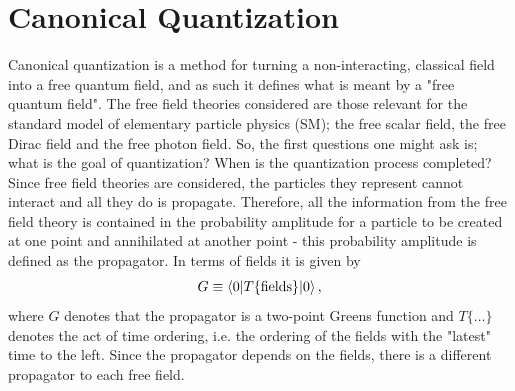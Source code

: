 \section{Canonical Quantization}
Canonical quantization is a method for turning a non-interacting, classical field into a free quantum field, and as such it defines what is meant by a "free quantum field". The free field theories considered are those relevant for the standard model of elementary particle physics (SM); the free scalar field, the free Dirac field and the free photon field.
So, the first questions one might ask is; what is the goal of quantization? When is the quantization process completed? Since free field theories are considered, the particles they represent cannot interact and all they do is propagate. Therefore, all the information from the free field theory is contained in the probability amplitude for a particle to be created at one point and annihilated at another point - this probability amplitude is defined as the propagator. In terms of fields it is given by
\begin{equation}
	G\equiv\braket{0|T\{\text{fields}\}|0},
	\label{prop def}
\end{equation} 
where $G$ denotes that the propagator is a two-point Greens function and $T\{\dots\}$ denotes the act of time ordering, i.e. the ordering of the fields with the "latest" time to the left. Since the propagator depends on the fields, there is a different propagator to each free field.

